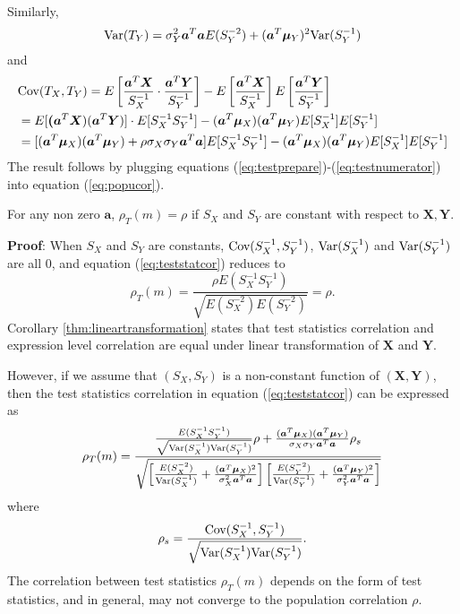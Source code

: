 	Similarly, 
	\begin{equation}\label{eq:testdenom2}
	\text{Var}(T_Y)= \sigma_Y^2\bm a^T\bm a E(S_Y^{-2}) + (\bm a^T\bm \mu_Y)^2\text{Var}(S_Y^{-1})
	\end{equation}
	and
	\begin{equation}\label{eq:testnumerator}
	\begin{aligned}
	&\text{Cov}(T_X, T_Y) = E\left[\frac{ \bm a^T\bm X }{S_X^{-1}}\cdot\frac{ \bm a^T\bm Y 
	}{S_Y^{-1}}\right] - E\left[\frac{\bm a^T\bm X}{S_X^{-1}}\right]E\left[\frac{\bm a^T\bm 
	Y}{S_Y^{-1}}\right] \\
	& = E[\bm (\bm a^T\bm X)(\bm a^T\bm Y)]\cdot E[S_X^{-1}S_Y^{-1}]-(\bm a^T\bm \mu_X)(\bm a^T\bm 
	\mu_Y)E[S_X^{-1}]E[S_Y^{-1}]\\
	& = [(\bm a^T\bm \mu_X)(\bm a^T\bm \mu_Y)+ \rho \sigma_X\sigma_Y\bm a^T\bm 
	a]E[S_X^{-1}S_Y^{-1}]- (\bm a^T\bm \mu_X)(\bm a^T\bm \mu_Y)E[S_X^{-1}]E[S_Y^{-1}]
	\end{aligned}
	\end{equation}	
	The result follows by plugging equations (\ref{eq:testprepare})-(\ref{eq:testnumerator}) into 
	equation (\ref{eq:popucor}).
	
	\begin{corollary}\label{thm:lineartransformation} 
		For any non zero $\bm a$, $\rho_T(m)=\rho$ if $S_X$ and $S_Y$ are constant with respect to 
		$\bm X, \bm Y$. 
	\end{corollary}
	\textbf{Proof}: When $S_X$ and $S_Y$ are constants, $\text{Cov}(S_X^{-1}, S_Y^{-1})$, $\text{Var}(S_X^{-1}) 
	$ and $\text{Var}(S_Y^{-1})$ are all 0, and equation (\ref{eq:teststatcor}) reduces to 
	\begin{equation}
	\rho_T(m) = \frac{\rho E(S_X^{-1}S_Y^{-1})}{\sqrt{E(S_X^{-2})E(S_Y^{-2})}} = \rho.
	\end{equation}
	Corollary \ref{thm:lineartransformation} states that test statistics correlation and expression 
	level correlation are equal under linear transformation of $\bm X$ and $\bm Y$. 
	
	However, if we 
	assume that $(S_X, S_Y)$ is a non-constant function of $(\bm X, \bm Y)$, then the test 
	statistics correlation in equation (\ref{eq:teststatcor}) can be expressed as  
	\begin{equation}
	\rho_T(m) = \frac{ \frac{E(S_X^{-1}S_Y^{-1})}
		{\sqrt{\text{Var}(S_X^{-1})\text{Var}(S_Y^{-1})}}\rho + \frac{(\bm a^T\bm \mu_X)(\bm a^T\bm 
		\mu_Y)}{\sigma_X\sigma_Y\bm a^T\bm a} \rho_s	
	}{\sqrt{\left[ \frac{E(S_X^{-2})}{\text{Var}(S_X^{-1})} + \frac{(\bm a^T\bm \mu_X)^2}{\sigma_X^2\bm 
	a^T\bm a}\right]\left[ \frac{E(S_Y^{-2})}{\text{Var}(S_Y^{-1})} + \frac{(\bm a^T\bm 
	\mu_Y)^2}{\sigma_Y^2\bm a^T\bm a}\right]}} 
	\end{equation}
	where 
	\begin{equation}
	\rho_s = \frac{\text{Cov}(S_X^{-1},S_Y^{-1})}{\sqrt{\text{Var}(S_X^{-1})\text{Var}(S_Y^{-1})}}.
	\end{equation}
	The correlation between test statistics $\rho_T(m)$ depends on the form of test statistics, and 
	in general,  may not converge to the population correlation $\rho$. 
	
